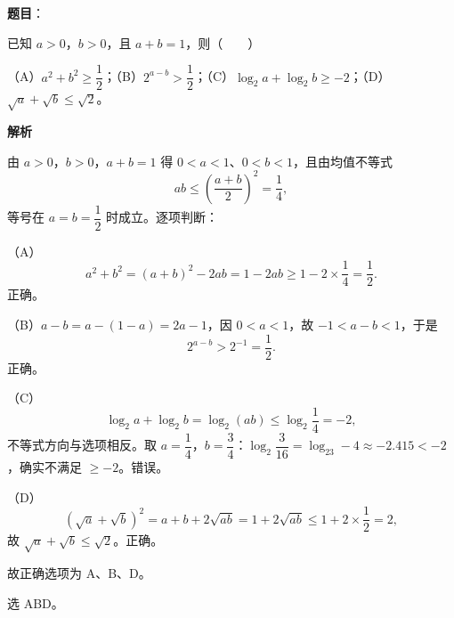 \begin{answer}

\textbf{题目}：

已知 $a>0$，$b>0$，且 $a+b=1$，则\mbox{（　　）}

（A）$a^2+b^2\geqslant\dfrac12$；（B）$2^{a-b}>\dfrac12$；（C）$\log_2a+\log_2b\geqslant-2$；（D）$\sqrt a+\sqrt b\leqslant\sqrt2$。

\textbf{解析}

由 $a>0$，$b>0$，$a+b=1$ 得 $0<a<1$、$0<b<1$，且由均值不等式
\nopagebreak[4]
\[ab\leqslant\left(\frac{a+b}2\right)^2=\frac14,\]
等号在 $a=b=\dfrac12$ 时成立。逐项判断：

（A）
\nopagebreak[4]
\[a^2+b^2=(a+b)^2-2ab=1-2ab\geqslant1-2\times\frac14=\frac12 .\]
正确。

（B）$a-b=a-(1-a)=2a-1$，因 $0<a<1$，故 $-1<a-b<1$，于是
\nopagebreak[4]
\[2^{a-b}>2^{-1}=\frac12 .\]
正确。

（C）
\nopagebreak[4]
\[\log_2a+\log_2b=\log_2(ab)\leqslant\log_2\frac14=-2,\]
不等式方向与选项相反。取 $a=\dfrac14$，$b=\dfrac34$：$\log_2\dfrac3{16}=\log_23-4\approx-2.415<-2$，确实不满足 $\geqslant-2$。错误。

（D）
\nopagebreak[4]
\[\left(\sqrt a+\sqrt b\right)^2=a+b+2\sqrt{ab}=1+2\sqrt{ab}\leqslant1+2\times\frac12=2,\]
故 $\sqrt a+\sqrt b\leqslant\sqrt2$。正确。

故正确选项为 A、B、D。

选 ABD。


\end{answer}
